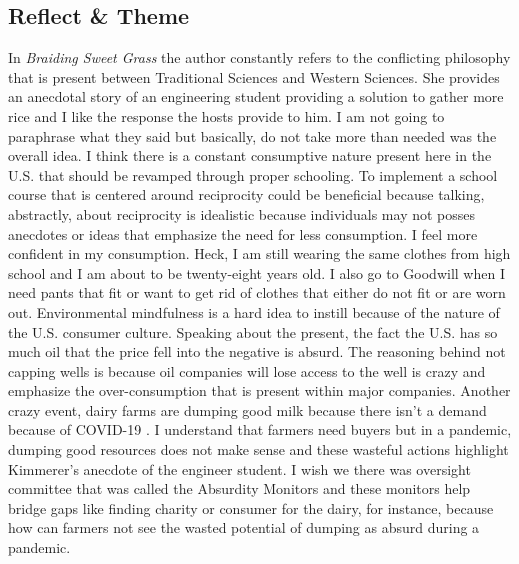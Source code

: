 \documentclass[a4paper,man,biblatex]{apa6}
\begin{document}
\subsection{Reflect \& Theme} In \textit{Braiding Sweet Grass} the author constantly refers to the conflicting philosophy that is present between Traditional Sciences and Western Sciences. She provides an anecdotal story of an engineering student providing a solution to gather more rice and I like the response the hosts provide to him. I am not going to paraphrase what they said but basically, do not take more than needed was the overall idea. I think there is a constant consumptive nature present here in the U.S. that should be revamped through proper schooling. To implement a school course that is centered around reciprocity could be beneficial because talking, abstractly, about reciprocity is idealistic because individuals may not posses anecdotes or ideas that emphasize the need for less consumption. I feel more confident in my consumption. Heck, I am still wearing the same clothes from high school and I am about to be twenty-eight years old. I also go to Goodwill when I need pants that fit or want to get rid of clothes that either do not fit or are worn out. Environmental mindfulness is a hard idea to instill because of the nature of the U.S. consumer culture. Speaking about the present, the fact the U.S. has so much oil that the price fell into the negative is absurd. The reasoning behind not capping wells is because oil companies will lose access to the well is crazy and emphasize the over-consumption that is present within major companies. Another crazy event, dairy farms are dumping good milk because there isn't a demand because of COVID-19 \autocite{dairyfarm}. I understand that farmers need buyers but in a pandemic, dumping good resources does not make sense and these wasteful actions highlight Kimmerer's anecdote of the engineer student. I wish we there was oversight committee that was called the Absurdity Monitors and these monitors help bridge gaps like finding charity or consumer for the dairy, for instance, because how can farmers not see the wasted potential of dumping as absurd during a pandemic.
\end{document}
